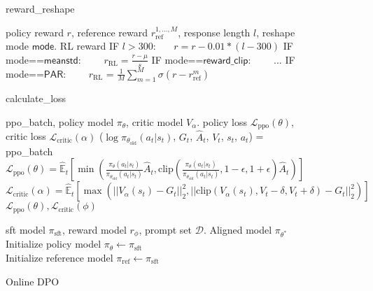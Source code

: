 \begin{figure*}[htbp]
    \centering
\begin{algorithm}[H]
\caption{reward\_reshape}
\label{alg:reward_reshape}
\begin{algorithmic}[1]
\Require policy reward $r$, reference reward $r_{\text{ref}}^{1,\ldots,M}$, response length $l$, reshape mode $\mathsf{mode}$.
\Ensure RL reward 
\State IF $l>300$:
\State \ \ \ $r=r-0.01*(l-300)$ 
\State IF mode==$\mathsf{meanstd}$: 
\State\ \ \ \ $r_{\text{RL}} = \frac{r-\mu}{s}$ 
\State IF mode==$\mathsf{reward\_clip}$:
\State\ \ \ \  ...
\State IF mode==$\mathsf{PAR}$:
\State \ \ \ \ $r_\text{RL}$ = $\frac{1}{M}\sum_{m=1}^M\sigma(r-r_{\text{ref}}^{m})$ 

\end{algorithmic}
\end{algorithm}
\begin{algorithm}[H]
\caption{calculate\_loss}
\label{alg:policy_loss}
\begin{algorithmic}[1]
\Require ppo\_batch, policy model $\pi_\theta$, critic model $V_\alpha$.
\Ensure policy loss $\mathcal{L}_\text{ppo}(\theta)$, critic loss $\mathcal{L}_\text{critic}(\alpha)$
\State ($\log\pi_{\theta_\text{old}}(a_t|s_t)$, $G_t$, $\hat{A}_t$, $V_t$, $s_t$, $a_t$) = ppo\_batch 
\State $\mathcal{L}_\text{ppo}(\theta) = \hat{\mathbb{E}}_t \left[ \min \left( \frac{\pi_\theta(a_t|s_t)}{\pi_{\theta_{\text{old}}}(a_t|s_t)} \hat{A}_t, \text{clip} \left( \frac{\pi_\theta(a_t|s_t)}{\pi_{\theta_{\text{old}}}(a_t|s_t)}, 1 - \epsilon, 1 + \epsilon \right) \hat{A}_t \right) \right]$
\State $\mathcal{L}_\text{critic}(\alpha)=\hat{\mathbb{E}}_t\left[\max\left(||V_{\alpha}(s_t)-G_t||_2^2, ||\text{clip}(V_\alpha(s_t),V_t-\delta,V_t+\delta)-G_t||_2^2\right)\right]$ \\

\Return $\mathcal{L}_\text{ppo}(\theta), \mathcal{L}_\text{critic}(\phi)$
\end{algorithmic}
\end{algorithm}


\begin{algorithm}[H]
\caption{Online DPO}
\label{alg:dpo}
\begin{algorithmic}[1]
\Require sft model $\pi_{\text{sft}}$, reward model $r_{\phi}$, prompt set $\mathcal{D}$.
\Ensure 
    Aligned model $\pi_{\theta^*}$\\
Initialize policy model $\pi_\theta\leftarrow\pi_{\text{sft}}$\\
Initialize reference model $\pi_{\text{ref}}\leftarrow\pi_{\text{sft}}$


\end{algorithmic}
\end{algorithm}
\end{figure*}

